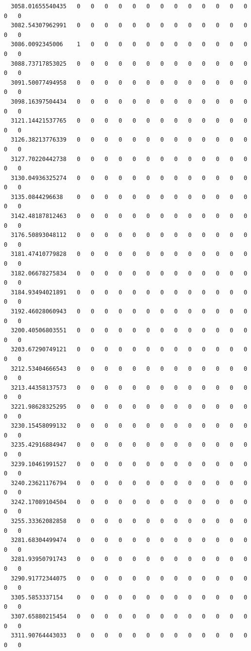 \documentclass[
  letterpaper,
  DIV=11,
  numbers=noendperiod]{scrartcl}
\begin{document}
\begin{verbatim}
  3058.01655540435   0   0   0   0   0   0   0   0   0   0   0   0   0   0   0
  3082.54307962991   0   0   0   0   0   0   0   0   0   0   0   0   0   0   0
  3086.0092345006    1   0   0   0   0   0   0   0   0   0   0   0   0   0   0
  3088.73717853025   0   0   0   0   0   0   0   0   0   0   0   0   0   0   0
  3091.50077494958   0   0   0   0   0   0   0   0   0   0   0   0   0   0   0
  3098.16397504434   0   0   0   0   0   0   0   0   0   0   0   0   0   0   0
  3121.14421537765   0   0   0   0   0   0   0   0   0   0   0   0   0   0   0
  3126.38213776339   0   0   0   0   0   0   0   0   0   0   0   0   0   0   0
  3127.70220442738   0   0   0   0   0   0   0   0   0   0   0   0   0   0   0
  3130.04936325274   0   0   0   0   0   0   0   0   0   0   0   0   0   0   0
  3135.0844296638    0   0   0   0   0   0   0   0   0   0   0   0   0   0   0
  3142.48187812463   0   0   0   0   0   0   0   0   0   0   0   0   0   0   0
  3176.50893048112   0   0   0   0   0   0   0   0   0   0   0   0   0   0   0
  3181.47410779828   0   0   0   0   0   0   0   0   0   0   0   0   0   0   0
  3182.06678275834   0   0   0   0   0   0   0   0   0   0   0   0   0   0   0
  3184.93494021891   0   0   0   0   0   0   0   0   0   0   0   0   0   0   0
  3192.46028060943   0   0   0   0   0   0   0   0   0   0   0   0   0   0   0
  3200.40506803551   0   0   0   0   0   0   0   0   0   0   0   0   0   0   0
  3203.67290749121   0   0   0   0   0   0   0   0   0   0   0   0   0   0   0
  3212.53404666543   0   0   0   0   0   0   0   0   0   0   0   0   0   0   0
  3213.44358137573   0   0   0   0   0   0   0   0   0   0   0   0   0   0   0
  3221.98628325295   0   0   0   0   0   0   0   0   0   0   0   0   0   0   0
  3230.15458099132   0   0   0   0   0   0   0   0   0   0   0   0   0   0   0
  3235.42916884947   0   0   0   0   0   0   0   0   0   0   0   0   0   0   0
  3239.10461991527   0   0   0   0   0   0   0   0   0   0   0   0   0   0   0
  3240.23621176794   0   0   0   0   0   0   0   0   0   0   0   0   0   0   0
  3242.17089104504   0   0   0   0   0   0   0   0   0   0   0   0   0   0   0
  3255.33362082858   0   0   0   0   0   0   0   0   0   0   0   0   0   0   0
  3281.68304499474   0   0   0   0   0   0   0   0   0   0   0   0   0   0   0
  3281.93950791743   0   0   0   0   0   0   0   0   0   0   0   0   0   0   0
  3290.91772344075   0   0   0   0   0   0   0   0   0   0   0   0   0   0   0
  3305.5853337154    0   0   0   0   0   0   0   0   0   0   0   0   0   0   0
  3307.65880215454   0   0   0   0   0   0   0   0   0   0   0   0   0   0   0
  3311.90764443033   0   0   0   0   0   0   0   0   0   0   0   0   0   0   0
                  

\end{verbatim}
\end{document}
